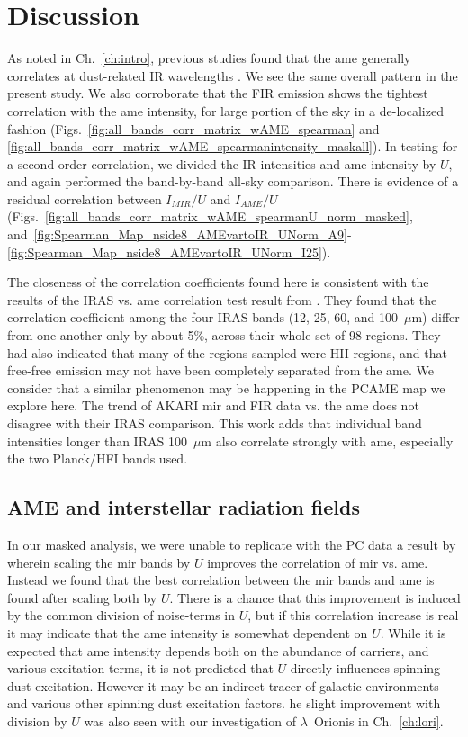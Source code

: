     \section{Discussion}
        As noted in Ch.~\ref{ch:intro}, previous studies found that the \gls{ame} generally correlates at dust-related IR wavelengths \citep{ysard10b,planckXV, hensley16}. We see the same overall pattern in the present study. We also corroborate that the FIR emission shows the tightest correlation with the \gls{ame} intensity, for large portion of the sky in a de-localized fashion (Figs.~\ref{fig:all_bands_corr_matrix_wAME_spearman} and~ \ref{fig:all_bands_corr_matrix_wAME_spearmanintensity_maskall}). In testing for a second-order correlation, we divided the IR intensities and \gls{ame} intensity by $U$, and again performed the band-by-band all-sky comparison. There is evidence of a residual correlation between $I_{MIR}/U$ and $I_{AME}/U$ (Figs.~\ref{fig:all_bands_corr_matrix_wAME_spearmanU_norm_masked}, and~\ref{fig:Spearman_Map_nside8_AMEvartoIR_UNorm_A9}-\ref{fig:Spearman_Map_nside8_AMEvartoIR_UNorm_I25}).

       The closeness of the correlation coefficients found here is consistent with the results of the IRAS vs. \gls{ame} correlation test result from \cite{planckXV}. They found that the correlation coefficient among the four IRAS bands (12, 25, 60, and 100~$\mu$m) differ from one another only by about 5\%, across their whole set of 98 regions. They had also indicated that many of the regions sampled were HII regions, and that free-free emission may not have been completely separated from the \gls{ame}. We consider that a similar phenomenon may be happening in the PCAME map we explore here. The trend of AKARI \gls{mir} and FIR data vs. the \gls{ame} does not disagree with their IRAS comparison. This work adds that individual band intensities longer than IRAS 100~$\mu$m also correlate strongly with \gls{ame}, especially the two Planck/HFI bands used.

          \subsection{AME and interstellar radiation fields}
            In our masked analysis, we were unable to replicate with the PC data a result by \cite{ysard10b} wherein scaling the \gls{mir} bands by $U$ improves the correlation of \gls{mir} vs. \gls{ame}. Instead we found that the best correlation between the \gls{mir} bands and \gls{ame} is found after scaling both by $U$. There is a chance that this improvement is induced by the common division of noise-terms in $U$, but if this correlation increase is real it may indicate that the \gls{ame} intensity is somewhat dependent on $U$. While it is expected that \gls{ame} intensity depends both on the abundance of carriers, and various excitation terms, it is not predicted that $U$ directly influences spinning dust excitation. However it may be an indirect tracer of galactic environments and various other spinning dust excitation factors. he slight improvement with division by $U$ was also seen with our investigation of $\lambda$~Orionis in Ch.~\ref{ch:lori}.

